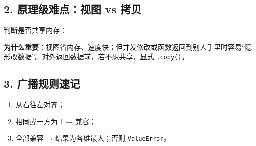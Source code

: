 \subsection{2. 原理级难点：视图 vs
拷贝}\label{ux539fux7406ux7ea7ux96beux70b9ux89c6ux56fe-vs-ux62f7ux8d1d}

\begin{Shaded}
\begin{Highlighting}[]
\OperatorTok{=}\OperatorTok{=}\NormalTok{)}

\OperatorTok{=}\NormalTok{)}
\OperatorTok{=}\NormalTok{, }\NormalTok{)     }
\NormalTok{b[}\NormalTok{, }\NormalTok{] }\OperatorTok{=} 
\NormalTok{(a[}\NormalTok{])             }

\OperatorTok{=}
\NormalTok{c[}\NormalTok{] }\OperatorTok{=}                 
\NormalTok{(a[}\NormalTok{])             }
\end{Highlighting}
\end{Shaded}

判断是否共享内存：

\begin{Shaded}
\begin{Highlighting}[]
\end{Highlighting}
\end{Shaded}

\textbf{为什么重要}：视图省内存、速度快；但并发修改或函数返回到别人手里时容易``隐形改数据''。对外返回数据前，若不想共享，显式
\texttt{.copy()}。

\subsection{3. 广播规则速记}\label{ux5e7fux64adux89c4ux5219ux901fux8bb0}

\begin{enumerate}
\def\labelenumi{\arabic{enumi}.}
\tightlist
\item
  从右往左对齐；
\item
  相同或一方为 1 → 兼容；
\item
  全部兼容 → 结果为各维最大；否则 \texttt{ValueError}。
\end{enumerate}

